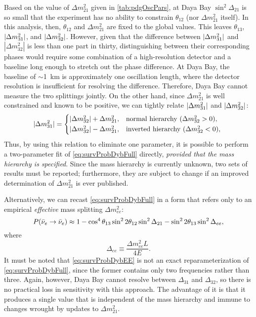 \documentclass[../thesis.tex]{subfiles}
\begin{document}
Based on the value of $\Delta m^2_{21}$ given in \autoref{tab:pdgOscPars}, at Daya Bay \(\sin^2 \Delta_{21}\) is so small that the experiment has no ability to constrain $\theta_{12}$ (nor \(\Delta m^2_{21}\) itself). In this analysis, then, $\theta_{12}$ and $\Delta m^2_{21}$ are fixed to the global values. This leaves $\theta_{13}$, \(\lvert \Delta m^2_{31}\rvert\), and \(\lvert \Delta m^2_{32}\rvert\). However, given that the difference between \(\lvert \Delta m^2_{31}\rvert\) and \(|\Delta m^2_{32}|\) is less than one part in thirty, distinguishing between their corresponding phases would require some combination of a high-resolution detector and a baseline long enough to stretch out the phase difference. At Daya Bay, the baseline of $\sim$1~km is approximately one oscillation length, where the detector resolution is insufficient for resolving the difference. Therefore, Daya Bay cannot measure the two splittings jointly. On the other hand, since \(\Delta m^2_{21}\) is well constrained and known to be positive, we can tightly relate \(\lvert \Delta m^2_{31}\rvert\) and \(\lvert \Delta m^2_{32}\rvert\):
\begin{equation*}
  \label{eq:hierarchy}
  \abs{\Delta m^2_{31}} =
  \begin{cases*}
    \abs{\Delta m^2_{32}} + \Delta m^2_{21}, & normal hierarchy ($\Delta m^2_{32} > 0$), \\
    \abs{\Delta m^2_{32}} - \Delta m^2_{21}, & inverted hierarchy ($\Delta m^2_{32} < 0$), \\
  \end{cases*}
\end{equation*}
Thus, by using this relation to eliminate one parameter, it is possible to perform a two-parameter fit of \eqref{eq:survProbDybFull} directly, \emph{provided that the mass hierarchy is specified}. Since the mass hierarchy is currently unknown, two sets of results must be reported; furthermore, they are subject to change if an improved determination of \(\Delta m^2_{21}\) is ever published.

Alternatively, we can recast \eqref{eq:survProbDybFull} in a form that refers only to an empirical \emph{effective} mass splitting \(\Delta m^2_{ee}\):
\begin{equation}
  \label{eq:survProbDybEE}
  P(\bar\nu_e \rightarrow \bar\nu_e) \approx 1 - \cos^4\theta_{13}\sin^2 2\theta_{12} \sin^2 \Delta_{21}
  - \sin^2 2\theta_{13}\sin^2\Delta_{ee},
\end{equation}
where
\begin{equation*}
  \Delta_{ee} \equiv \frac{\Delta m^2_{ee}L}{4E}. 
\end{equation*}
It must be noted that \eqref{eq:survProbDybEE} is not an exact reparameterization of \eqref{eq:survProbDybFull}, since the former contains only two frequencies rather than three. Again, however, Daya Bay cannot resolve between $\Delta_{31}$ and $\Delta_{32}$, so there is no practical loss in sensitivity with this approach. The advantage of it is that it produces a single value that is independent of the mass hierarchy and immune to changes wrought by updates to \(\Delta m^2_{21}\).
\end{document}

